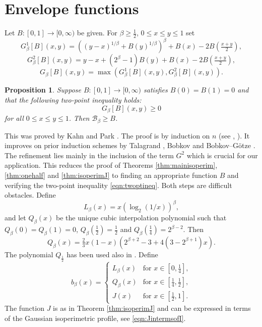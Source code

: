 \documentclass[12pt]{amsart}
\theoremstyle{plain}
\newtheorem{prop}[thm]{Proposition}
\theoremstyle{definition}
\theoremstyle{remark}
\numberwithin{equation}{section}
\begin{document}
\section{Envelope functions}\label{sec:envelope}
Let $B:[0,1]\to [0,\infty)$ be given. For $\beta\ge \tfrac12$, $0\le x\le y\le 1$ set
\begin{equation}\label{eqn:Gdef}
G^1_{\beta}[B](x,y) = ((y-x)^{1/\beta}+B(y)^{1/\beta})^\beta + B(x) - 2 B(\tfrac{x+y}2),
\end{equation}
\[ G^2_{\beta}[B](x,y) = y-x + (2^\beta-1) B(y)  + B(x) - 2 B(\tfrac{x+y}2), \]
\[ G_{\beta}[B](x,y) = \max(G^1_\beta[B](x,y), G^2_{\beta}[B](x,y)).  \]

\begin{prop}\label{prop:kahnpark}
Suppose  $B:[0,1]\to [0,\infty)$ satisfies $B(0)=B(1)=0$ and that the following two-point inequality holds:
\begin{equation}\label{eqn:twoptineq}
G_\beta[B](x,y)\ge 0
\end{equation}
for all $0\le x\le y\le 1$. Then $\mathcal{B}_\beta\ge B$.
\end{prop}
This was proved by Kahn and Park \cite{KP20}. The proof is by induction on $n$ (see \cite{KP20}, \cite{BIM23}). It improves on prior induction schemes by Talagrand \cite{Tal93}, Bobkov \cite{Bob97} and Bobkov--G\"otze \cite{BG99}.
The refinement lies mainly in the inclusion of the term $G^2$ which is crucial for our application.
This reduces the proof of Theorems \ref{thm:mainisoperim}, \ref{thm:onehalf} and \ref{thm:isoperimJ} to finding an appropriate function $B$ and verifying the two-point inequality \eqref{eqn:twoptineq}. 
Both steps are difficult obstacles.
Define 
\[ L_\beta(x) = x (\log_2(1/x))^\beta, \]
and let $Q_\beta(x)$ be the unique cubic interpolation polynomial such that $Q_\beta(0)=Q_\beta(1)=0$, $Q_\beta(\frac12)=\frac12$ and $Q_\beta(\frac14)=2^{\beta-2}$. Then
\[ Q_\beta(x) = \tfrac23 x (1-x)(2^{\beta+2}-3+4(3-2^{\beta+1})  x). \]
The polynomial $Q_\frac12$ has been used also in \cite{BIM23}.
Define
\begin{equation}\label{eqn:bbdef}
b_\beta(x) = \left\{ \begin{array}{ll}
    L_\beta(x) & \text{for } x\in [0, \frac14],\\
    Q_\beta(x)
     & \text{for }x\in [\frac14, \frac12],\\
    J(x) & \text{for }x\in [\frac12, 1].
    \end{array}\right.
\end{equation}
The function $J$ is as in Theorem \ref{thm:isoperimJ} and 
can be expressed in terms of the Gaussian isoperimetric profile, see \eqref{eqn:JintermsofI}.
\end{document}
